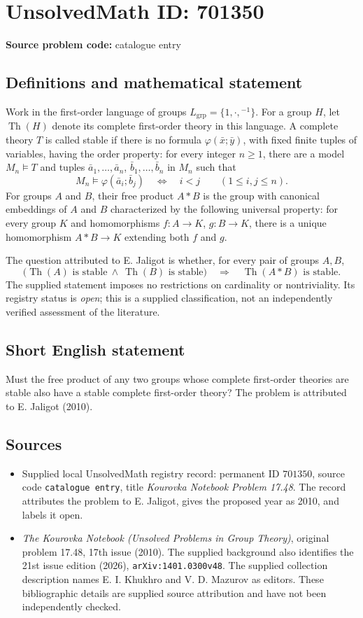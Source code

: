 \documentclass[11pt]{article}
\begin{document}
\section*{UnsolvedMath ID: 701350}
\textbf{Source problem code:} catalogue entry
\subsection{Definitions and mathematical statement}
Work in the first-order language of groups \(L_{\mathrm{grp}}=\{1,\cdot,{}^{-1}\}\). For a group \(H\), let \(\operatorname{Th}(H)\) denote its complete first-order theory in this language. A complete theory \(T\) is called stable if there is no formula \(\varphi(\bar x;\bar y)\), with fixed finite tuples of variables, having the order property: for every integer \(n\geq 1\), there are a model \(M_n\models T\) and tuples \(\bar a_1,\ldots,\bar a_n\), \(\bar b_1,\ldots,\bar b_n\) in \(M_n\) such that
\[
M_n\models\varphi(\bar a_i;\bar b_j)\quad\Longleftrightarrow\quad i<j
\qquad(1\leq i,j\leq n).
\]
For groups \(A\) and \(B\), their free product \(A*B\) is the group with canonical embeddings of \(A\) and \(B\) characterized by the following universal property: for every group \(K\) and homomorphisms \(f:A\to K\), \(g:B\to K\), there is a unique homomorphism \(A*B\to K\) extending both \(f\) and \(g\).

The question attributed to E. Jaligot is whether, for every pair of groups \(A,B\),
\[
\bigl(\operatorname{Th}(A)\text{ is stable}\ \land\ \operatorname{Th}(B)\text{ is stable}\bigr)
\quad\Longrightarrow\quad
\operatorname{Th}(A*B)\text{ is stable}.
\]
The supplied statement imposes no restrictions on cardinality or nontriviality. Its registry status is \emph{open}; this is a supplied classification, not an independently verified assessment of the literature.
\subsection{Short English statement}
Must the free product of any two groups whose complete first-order theories are stable also have a stable complete first-order theory? The problem is attributed to E. Jaligot (2010).
\subsection{Sources}
\begin{itemize}
\item Supplied local UnsolvedMath registry record: permanent ID \(701350\), source code \texttt{catalogue entry}, title \emph{Kourovka Notebook Problem 17.48}. The record attributes the problem to E. Jaligot, gives the proposed year as 2010, and labels it open.
\item \emph{The Kourovka Notebook (Unsolved Problems in Group Theory)}, original problem 17.48, 17th issue (2010). The supplied background also identifies the 21st issue edition (2026), \texttt{arXiv:1401.0300v48}. The supplied collection description names E. I. Khukhro and V. D. Mazurov as editors. These bibliographic details are supplied source attribution and have not been independently checked.
\end{itemize}
\end{document}
